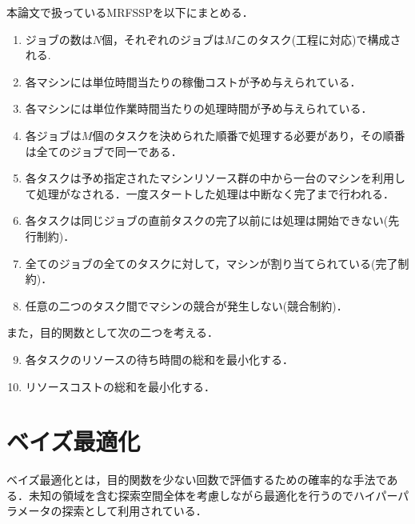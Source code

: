 本論文で扱っているMRFSSPを以下にまとめる．

\begin{enumerate} 
\item ジョブの数は$N$個，それぞれのジョブは$M$このタスク(工程に対応)で構成される. 
\item 各マシンには単位時間当たりの稼働コストが予め与えられている．
\item 各マシンには単位作業時間当たりの処理時間が予め与えられている．
\item 各ジョブは$M$個のタスクを決められた順番で処理する必要があり，その順番は全てのジョブで同一である．
\item 各タスクは予め指定されたマシンリソース群の中から一台のマシンを利用して処理がなされる．一度スタートした処理は中断なく完了まで行われる．
\item 各タスクは同じジョブの直前タスクの完了以前には処理は開始できない(先行制約)．
\item 全てのジョブの全てのタスクに対して，マシンが割り当てられている(完了制約)．
\item 任意の二つのタスク間でマシンの競合が発生しない(競合制約)．
\end{enumerate}

また，目的関数として次の二つを考える．
\begin{enumerate} 
\setcounter{enumi}{8} 
\item 各タスクのリソースの待ち時間の総和を最小化する．
\item リソースコストの総和を最小化する．
\end{enumerate}

\section{ベイズ最適化}
ベイズ最適化とは，目的関数を少ない回数で評価するための確率的な手法である．未知の領域を含む探索空間全体を考慮しながら最適化を行うのでハイパーパラメータの探索として利用されている．
